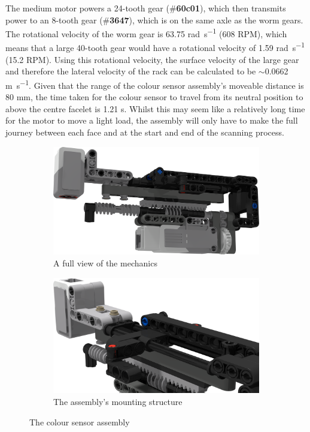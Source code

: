 \documentclass{report}
\newcommand{\tbo}[1]{\textbf{#1}}
\newcommand{\legopiece}[1]{(\#\tbo{#1})}
\begin{document}
	The medium motor powers a 24-tooth gear \legopiece{60c01}, which then transmits power to an 8-tooth gear \legopiece{3647}, which is on the same axle as the worm gears. The rotational velocity of the worm gear is 63.75 \si{\radian\per\second} (608 RPM), which means that a large 40-tooth gear would have a rotational velocity of 1.59 \si{\radian\per\second} (15.2 RPM). Using this rotational velocity, the surface velocity of the large gear and therefore the lateral velocity of the rack can be calculated to be $\sim$0.0662 \si{\meter\per\second}. Given that the range of the colour sensor assembly's moveable distance is 80 \si{\milli\metre}, the time taken for the colour sensor to travel from its neutral position to above the centre facelet is 1.21 \si{\second}. Whilst this may seem like a relatively long time for the motor to move a light load, the assembly will only have to make the full journey between each face and at the start and end of the scanning process.
	
	\begin{figure}[H]
		\centering
		\begin{subfigure}[b]{0.43427\textwidth}
			\includegraphics[width=\textwidth]{Resources/Images/rdrColorSensorAssembly.png}
			\caption{A full view of the mechanics}
			\label{fig:rdrColorSensorAssembly}
		\end{subfigure}
		\hspace{10mm}
		\begin{subfigure}[b]{0.4\textwidth}
			\includegraphics[width=\textwidth]{Resources/Images/rdrColorSensorShaftDetail.png}
			\caption{The assembly's mounting structure}
			\label{fig:rdrColorSensorShaftDetail}
		\end{subfigure}
		\caption{The colour sensor assembly}
		\label{fig:rdrColorSensor}
	\end{figure}
	
\end{document}
